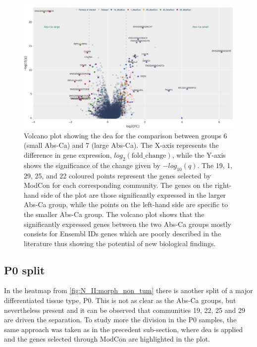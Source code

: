 \begin{figure}   
    \centering
    \includegraphics[width=1.0\textwidth,height=1.0\textheight,keepaspectratio]{Sections/Network_II/resources/non_tum/diff_split_dea.png}
    \caption{Volcano plot showing the \acrlong{dea} for the comparison between groups 6 (small Abs-Ca) and 7 (large Abs-Ca). The X-axis represents the difference in gene expression, $log_2(\text{fold\_change})$, while the Y-axis shows the significance of the change given by $-log_{10}(q)$. The 19, 1, 29, 25, and 22 coloured points represent the genes selected by ModCon for each corresponding community. The genes on the right-hand side of the plot are those significantly expressed in the larger Abs-Ca group, while the points on the left-hand side are specific to the smaller Abs-Ca group. The volcano plot shows that the significantly expressed genes between the two Abs-Ca groups mostly consists for Ensembl IDs genes which are poorly described in the literature thus showing the potential of new biological findings.}
    \label{fig:N_II:diff_split}
\end{figure}


\subsection{P0 split} \label{s:N_II:p0_split}

In the heatmap from \cref{fig:N_II:morph_non_tum} there is another split of a major differentiated tissue type, P0. This is not as clear as the Abs-Ca groups, but nevertheless present and it can be observed that communities 19, 22, 25 and 29 are driven the separation. To study more the division in the P0 samples, the same approach was taken as in the precedent sub-section, where \acrshort{dea} is applied and the genes selected through ModCon are highlighted in the plot.


